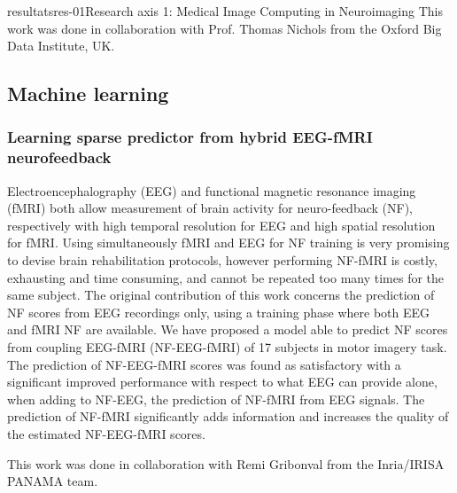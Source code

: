 \documentclass{ra2018}
\begin{document}
\begin{module}{resultats}{res-01}{Research axis 1: Medical Image Computing in Neuroimaging}
This work was done in collaboration with Prof. Thomas Nichols from the Oxford Big Data Institute, UK.

\subsection{Machine learning}

\subsubsection{Learning sparse predictor from hybrid EEG-fMRI neurofeedback}
\begin{participants}
\end{participants}
Electroencephalography (EEG) and functional magnetic resonance  imaging  (fMRI)  both  allow  measurement  of  brain  activity  for neuro-feedback (NF), respectively with high temporal resolution for EEG and  high  spatial  resolution  for  fMRI.  Using  simultaneously  fMRI  and EEG  for  NF  training  is  very  promising  to  devise  brain  rehabilitation protocols, however performing NF-fMRI is costly, exhausting and time consuming, and cannot be repeated too many times for the same subject. The original contribution of this work concerns the prediction of NF scores from EEG recordings only, using a training phase where both EEG and fMRI NF are available. We have proposed a model able to predict NF scores from coupling EEG-fMRI (NF-EEG-fMRI) of 17 subjects in motor imagery task. The prediction of NF-EEG-fMRI scores was found as satisfactory with a significant improved performance with respect to what EEG can provide alone, when adding to NF-EEG, the prediction of NF-fMRI from EEG signals. The prediction of NF-fMRI significantly adds information and increases the quality of the estimated NF-EEG-fMRI scores.

This work was done in collaboration with Remi Gribonval from the Inria/IRISA PANAMA team.

\end{module}
\end{document}
